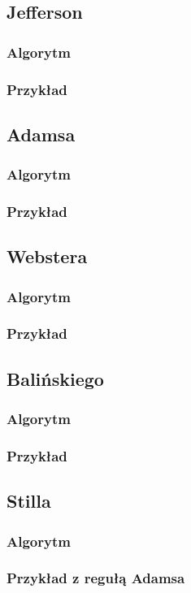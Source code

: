\documentclass[12pt,a4paper]{article}
\begin{document}
\subsection{Jefferson}
\subsubsection{Algorytm}
\subsubsection{Przykład}
\subsection{Adamsa}
\subsubsection{Algorytm}
\subsubsection{Przykład}
\subsection{Webstera}
\subsubsection{Algorytm}
\subsubsection{Przykład}
\subsection{Balińskiego}
\subsubsection{Algorytm}
\subsubsection{Przykład}
\subsection{Stilla}
\subsubsection{Algorytm}
\subsubsection{Przykład z regułą Adamsa}
\newpage
\end{document}
